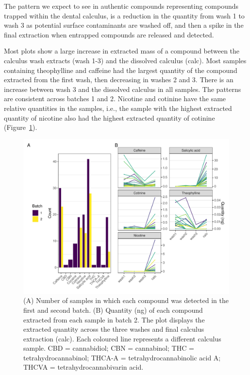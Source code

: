 \documentclass[
]{article}
\begin{document}
The pattern we expect to see in authentic compounds representing
compounds trapped within the dental calculus, is a reduction in the
quantity from wash 1 to wash 3 as potential surface contaminants are
washed off, and then a spike in the final extraction when entrapped
compounds are released and detected.

Most plots show a large increase in extracted mass of a compound between
the calculus wash extracts (wash 1-3) and the dissolved calculus (calc).
Most samples containing theophylline and caffeine had the largest
quantity of the compound extracted from the first wash, then decreasing
in washes 2 and 3. There is an increase between wash 3 and the dissolved
calculus in all samples. The patterns are consistent across batches 1
and 2. Nicotine and cotinine have the same relative quantities in the
samples, i.e., the sample with the highest extracted quantity of
nicotine also had the highest extracted quantity of cotinine
(Figure~\ref{fig-auth-plot-batch2}).

\begin{figure}

{\centering \includegraphics{paper_files/figure-pdf/fig-auth-plot-batch2-1.pdf}

}

\caption{\label{fig-auth-plot-batch2}(A) Number of samples in which each
compound was detected in the first and second batch. (B) Quantity (ng)
of each compound extracted from each sample in batch 2. The plot
displays the extracted quantity across the three washes and final
calculus extraction (calc). Each coloured line represents a different
calculus sample. CBD = cannabidiol; CBN = cannabinol; THC =
tetrahydrocannabinol; THCA-A = tetrahydrocannabinolic acid A; THCVA =
tetrahydrocannabivarin acid.}

\end{figure}
\end{document}
